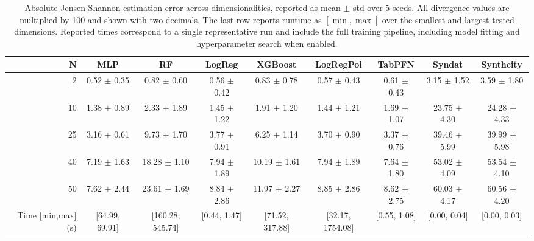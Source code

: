 \begin{table}[ht]
\centering
\small
\setlength{\tabcolsep}{3pt}
\caption{Absolute Jensen-Shannon estimation error across dimensionalities, reported as mean $\pm$ std over 5 seeds. All divergence values are multiplied by 100 and shown with two decimals. The last row reports runtime as $[\min, \max]$ over the smallest and largest tested dimensions. Reported times correspond to a single representative run and include the full training pipeline, including model fitting and hyperparameter search when enabled.}
\label{tab:uc7_abs_error_no_gt_mean_std_x100_2dec_time_range}
\begin{tabular}{rcccccccc}
\toprule
N & MLP & RF & LogReg & XGBoost & LogRegPol & TabPFN & Syndat & Synthcity \\
\midrule
2 & 0.52 $\pm$ 0.35 & 0.82 $\pm$ 0.60 & 0.56 $\pm$ 0.42 & 0.83 $\pm$ 0.78 & 0.57 $\pm$ 0.43 & 0.61 $\pm$ 0.43 & 3.15 $\pm$ 1.52 & 3.59 $\pm$ 1.80 \\
10 & 1.38 $\pm$ 0.89 & 2.33 $\pm$ 1.89 & 1.45 $\pm$ 1.22 & 1.91 $\pm$ 1.20 & 1.44 $\pm$ 1.21 & 1.69 $\pm$ 1.07 & 23.75 $\pm$ 4.30 & 24.28 $\pm$ 4.33 \\
25 & 3.16 $\pm$ 0.61 & 9.73 $\pm$ 1.70 & 3.77 $\pm$ 0.91 & 6.25 $\pm$ 1.14 & 3.70 $\pm$ 0.90 & 3.37 $\pm$ 0.76 & 39.46 $\pm$ 5.99 & 39.99 $\pm$ 5.98 \\
40 & 7.19 $\pm$ 1.63 & 18.28 $\pm$ 1.10 & 7.94 $\pm$ 1.89 & 10.19 $\pm$ 1.61 & 7.94 $\pm$ 1.89 & 7.64 $\pm$ 1.80 & 53.02 $\pm$ 4.09 & 53.54 $\pm$ 4.10 \\
50 & 7.62 $\pm$ 2.44 & 23.61 $\pm$ 1.69 & 8.84 $\pm$ 2.86 & 11.97 $\pm$ 2.27 & 8.85 $\pm$ 2.86 & 8.62 $\pm$ 2.75 & 60.03 $\pm$ 4.17 & 60.56 $\pm$ 4.20 \\
Time [min,max] (s) & [64.99, 69.91] & [160.28, 545.74] & [0.44, 1.47] & [71.52, 317.88] & [32.17, 1754.08] & [0.55, 1.08] & [0.00, 0.04] & [0.00, 0.03] \\
\bottomrule
\end{tabular}
\end{table}
